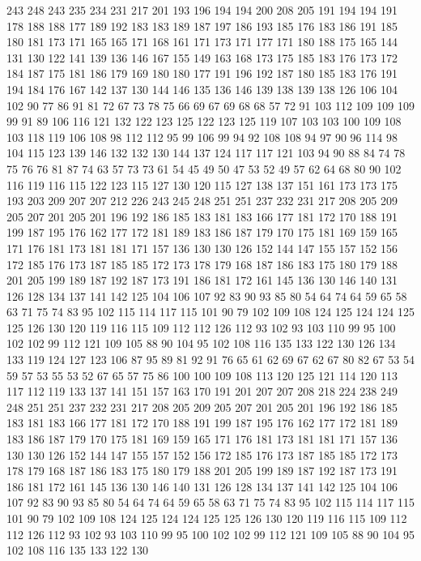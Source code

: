 243 248 243 235 234 231 217 201 193 196 194 194 200 208 205 191 194 194 191 178
188 188 177 189 192 183 183 189 187 197 186 193 185 176 183 186 191 185 180 181
173 171 165 165 171 168 161 171 173 171 177 171 180 188 175 165 144 131 130 122
141 139 136 146 167 155 149 163 168 173 175 185 183 176 173 172 184 187 175 181
186 179 169 180 180 177 191 196 192 187 180 185 183 176 191 194 184 176 167 142
137 130 144 146 135 136 146 139 138 139 138 126 106 104 102 90 77 86 91 81
72 67 73 78 75 66 69 67 69 68 68 57 72 91 103 112 109 109 109 99
91 89 106 116 121 132 122 123 125 122 123 125 119 107 103 103 100 109 108 103
118 119 106 108 98 112 112 95 99 106 99 94 92 108 108 94 97 90 96 114
98 104 115 123 139 146 132 132 130 144 137 124 117 117 121 103 94 90 88 84
74 78 75 76 76 81 87 74 63 57 73 73 61 54 45 49 50 47 53 52
49 57 62 64 68 80 90 102 116 119 116 115 122 123 115 127 130 120 115 127
138 137 151 161 173 173 175 193 203 209 207 207 212 226 243 245 248 251 251 237
232 231 217 208 205 209 205 207 201 205 201 196 192 186 185 183 181 183 166 177
181 172 170 188 191 199 187 195 176 162 177 172 181 189 183 186 187 179 170 175
181 169 159 165 171 176 181 173 181 181 171 157 136 130 130 126 152 144 147 155
157 152 156 172 185 176 173 187 185 185 172 173 178 179 168 187 186 183 175 180
179 188 201 205 199 189 187 192 187 173 191 186 181 172 161 145 136 130 146 140
131 126 128 134 137 141 142 125 104 106 107 92 83 90 93 85 80 54 64 74
64 59 65 58 63 71 75 74 83 95 102 115 114 117 115 101 90 79 102 109
108 124 125 124 124 125 125 126 130 120 119 116 115 109 112 112 126 112 93 102
93 103 110 99 95 100 102 102 99 112 121 109 105 88 90 104 95 102 108 116
135 133 122 130 126 134 133 119 124 127 123 106 87 95 89 81 92 91 76 65
61 62 69 67 62 67 80 82 67 53 54 59 57 53 55 53 52 67 65 57
75 86 100 100 109 108 113 120 125 121 114 120 113 117 112 119 133 137 141 151
157 163 170 191 201 207 207 208 218 224 238 249 248 251 251 237 232 231 217 208
205 209 205 207 201 205 201 196 192 186 185 183 181 183 166 177 181 172 170 188
191 199 187 195 176 162 177 172 181 189 183 186 187 179 170 175 181 169 159 165
171 176 181 173 181 181 171 157 136 130 130 126 152 144 147 155 157 152 156 172
185 176 173 187 185 185 172 173 178 179 168 187 186 183 175 180 179 188 201 205
199 189 187 192 187 173 191 186 181 172 161 145 136 130 146 140 131 126 128 134
137 141 142 125 104 106 107 92 83 90 93 85 80 54 64 74 64 59 65 58
63 71 75 74 83 95 102 115 114 117 115 101 90 79 102 109 108 124 125 124
124 125 125 126 130 120 119 116 115 109 112 112 126 112 93 102 93 103 110 99
95 100 102 102 99 112 121 109 105 88 90 104 95 102 108 116 135 133 122 130
